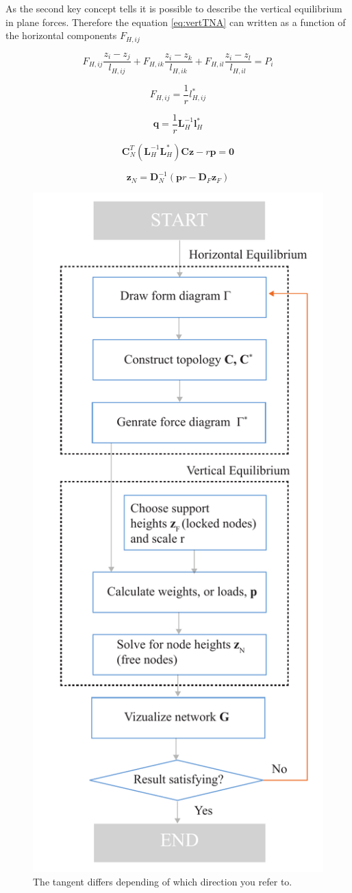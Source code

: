 As the second key concept tells it is possible to describe the vertical equilibrium in plane forces. Therefore the equation \ref{eq:vertTNA} can written as a function of the horizontal components $F_{H,ij}$  




\begin{equation}
    F_{H,ij}\frac{z_i-z_j}{l_{H,ij}} +F_{H,ik}\frac{z_i-z_k}{l_{H,ik}}+F_{H,il}\frac{z_i-z_l}{l_{H,il}} = P_i
\end{equation}


\begin{equation}
    F_{H,ij} =\frac{1}{r}{l^*_{H,ij}}
\end{equation}

\begin{equation}
    \textbf{q}=\frac{1}{r}\textbf{L}^{-1}_H\textbf{l}^*_{H}
\end{equation}

\begin{equation}
    \textbf{C}^T_N(\textbf{L}^{-1}_H\textbf{L}^*_H)\textbf{C}\textbf{z}- r\textbf{p} = \textbf{0}
\end{equation}

\begin{equation}
    \textbf{z}_N = \textbf{D}^{-1}_N(\textbf{p}r-\textbf{D}_F\textbf{z}_F)
\end{equation}


\begin{figure}[H]
\centering
\includegraphics[width=0.5\linewidth ]{figure/Theory/TNAScheme.pdf}
\caption{The tangent differs depending of which direction you refer to. }
\end{figure}

